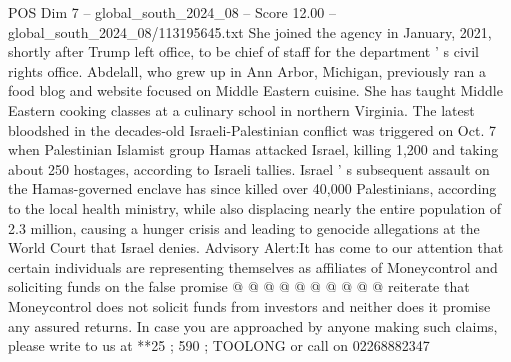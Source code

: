 \begin{textsample}{POS Dim 7 – global\_south\_2024\_08 – Score 12.00 – global\_south\_2024\_08/113195645.txt}
She joined the agency in January, 2021, shortly after Trump left office, to be chief of staff for the department ' s civil rights office.
Abdelall, who grew up in Ann Arbor, Michigan, previously ran a food blog and website focused on Middle Eastern cuisine.
She has taught Middle Eastern cooking classes at a culinary school in northern Virginia.
The latest bloodshed in the decades-old Israeli-Palestinian conflict was triggered on Oct. 7 when Palestinian Islamist group Hamas attacked Israel, killing 1,200 and taking about 250 hostages, according to Israeli tallies.
Israel ' s subsequent assault on the Hamas-governed enclave has since killed over 40,000 Palestinians, according to the local health ministry, while also displacing nearly the entire population of 2.3 million, causing a hunger crisis and leading to genocide allegations at the World Court that Israel denies.
Advisory Alert:It has come to our attention that certain individuals are representing themselves as affiliates of Moneycontrol and soliciting funds on the false promise @ @ @ @ @ @ @ @ @ @ reiterate that Moneycontrol does not solicit funds from investors and neither does it promise any assured returns.
In case you are approached by anyone making such claims, please write to us at **25 ; 590 ; TOOLONG or call on 02268882347

\end{textsample}
